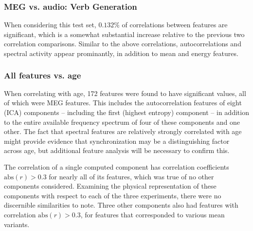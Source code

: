 \documentclass[utf8]{frontiersSCNS} %
\begin{document}

\subsubsection{MEG vs. audio: Verb Generation}

When considering this test set, $0.132$\% of correlations between features are significant, which is a somewhat substantial increase relative to the previous two correlation comparisons. Similar to the above correlations, autocorrelations and spectral activity appear prominantly, in addition to mean and energy features. 


\subsubsection{All features vs. age}

When correlating with age, 172 features were found to have significant values, all of which were MEG features. This includes the autocorrelation features of eight (ICA) components -- including the first (highest entropy) component -- in addition to the entire available frequency spectrum of four of these components and one other. The fact that spectral features are relatively strongly correlated with age might provide evidence that synchronization may be a distinguishing factor across age, but additional feature analysis will be necessary to confirm this.

The correlation of a single computed component has correlation coefficients $\text{abs}(r)>0.3$ for nearly all of its features, which was true of no other components considered. Examining the physical representation of these components with respect to each of the three experiments, there were no discernible similarities to note. Three other components also had features with correlation $\text{abs}(r)>0.3$, for features that corresponded to various mean variants.
\end{document}
